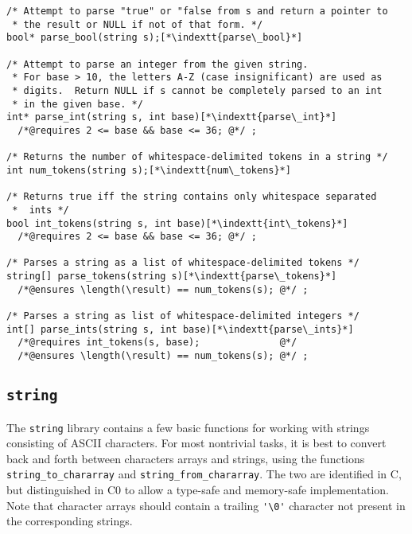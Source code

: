 \documentclass[11pt]{article}
\makeatletter
\newcommand{\indextt}[1]{\index{#1@\texttt{#1}}}
\makeatother
\begin{document}
\begin{lstlisting}
/* Attempt to parse "true" or "false from s and return a pointer to
 * the result or NULL if not of that form. */
bool* parse_bool(string s);[*\indextt{parse\_bool}*]

/* Attempt to parse an integer from the given string.
 * For base > 10, the letters A-Z (case insignificant) are used as
 * digits.  Return NULL if s cannot be completely parsed to an int
 * in the given base. */
int* parse_int(string s, int base)[*\indextt{parse\_int}*]
  /*@requires 2 <= base && base <= 36; @*/ ;

/* Returns the number of whitespace-delimited tokens in a string */
int num_tokens(string s);[*\indextt{num\_tokens}*]

/* Returns true iff the string contains only whitespace separated
 *  ints */
bool int_tokens(string s, int base)[*\indextt{int\_tokens}*]
  /*@requires 2 <= base && base <= 36; @*/ ;

/* Parses a string as a list of whitespace-delimited tokens */
string[] parse_tokens(string s)[*\indextt{parse\_tokens}*]
  /*@ensures \length(\result) == num_tokens(s); @*/ ;

/* Parses a string as list of whitespace-delimited integers */
int[] parse_ints(string s, int base)[*\indextt{parse\_ints}*]
  /*@requires int_tokens(s, base);              @*/
  /*@ensures \length(\result) == num_tokens(s); @*/ ;
\end{lstlisting}

\clearpage
\subsection{\tt string}

The \lstinline'string' library contains a few basic functions for working
with strings consisting of ASCII characters.  For most nontrivial
tasks, it is best to convert back and forth between characters arrays
and strings, using the functions \lstinline'string_to_chararray' and
\lstinline'string_from_chararray'.  The two are identified in C,
but distinguished in C0 to allow a type-safe and memory-safe
implementation.  Note that character arrays should contain a trailing
\lstinline"'\0'" character not present in the corresponding strings.
\end{document}
